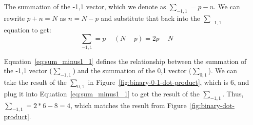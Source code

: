 The summation of the -1,1 vector, which we denote as $\sum_{-1,1} = p-n$. We can rewrite $p+n = N$ as $n = N - p$ and substitute that back into the $\sum_{-1,1}$ equation to get:\\
\begin{equation}
\sum_{-1,1} = p - (N - p) = 2p - N
\label{eq:sum_minus1_1}
\end{equation}

Equation~\ref{eq:sum_minus1_1} defines the relationship between the summation of the -1,1 vector ($\sum_{-1,1}$) and the summation of the 0,1 vector ($\sum_{0,1}$). We can take the result of the $\sum_{0,1}$ in Figure~\ref{fig:binary-0-1-dot-product}, which is $6$, and plug it into Equation~\ref{eq:sum_minus1_1} to get the result of the $\sum_{-1,1}$. Thus, $\sum_{-1,1} = 2*6 - 8 = 4$, which matches the result from Figure~\ref{fig:binary-dot-product}.




